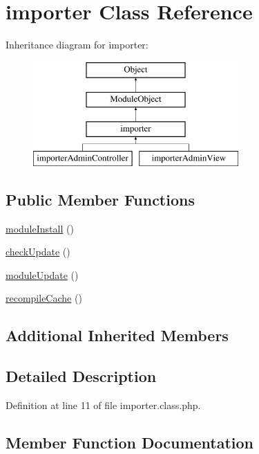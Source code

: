 \hypertarget{classimporter}{}\section{importer Class Reference}
\label{classimporter}
Inheritance diagram for importer\+:\begin{figure}[H]
\begin{center}
\leavevmode
\includegraphics[height=4.000000cm]{classimporter}
\end{center}
\end{figure}
\subsection*{Public Member Functions}
\begin{DoxyCompactItemize}
\item 
\hyperlink{classimporter_a33af57565401adc2b415a3403e7f86f0}{module\+Install} ()
\item 
\hyperlink{classimporter_a314878bedf131686018fcd9a7306a392}{check\+Update} ()
\item 
\hyperlink{classimporter_affadc5d8acbfc67adbd423350b1ccb96}{module\+Update} ()
\item 
\hyperlink{classimporter_a14049d84d0d3bb175857fc6e34447954}{recompile\+Cache} ()
\end{DoxyCompactItemize}
\subsection*{Additional Inherited Members}


\subsection{Detailed Description}


Definition at line 11 of file importer.\+class.\+php.



\subsection{Member Function Documentation}
\mbox{\label{classimporter_a314878bedf131686018fcd9a7306a392}} 
